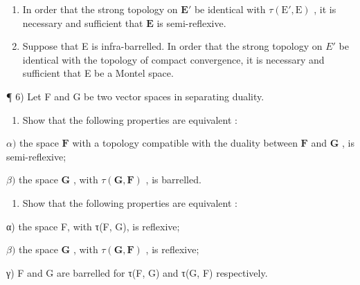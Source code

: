 \begin{enumerate}
\def\labelenumi{\alph{enumi})}
\item
  In order that the strong topology on \(\mathbf{E}'\) be identical with \(\tau (\mathrm{E}',\mathrm{E})\) , it is necessary and sufficient that \(\mathbf{E}\) is semi-reflexive.
\item
  Suppose that E is infra-barrelled. In order that the strong topology on \(E'\) be identical with the topology of compact convergence, it is necessary and sufficient that E be a Montel space.
\end{enumerate}

¶ 6) Let F and G be two vector spaces in separating duality.

\begin{enumerate}
\def\labelenumi{\alph{enumi})}
\tightlist
\item
  Show that the following properties are equivalent :
\end{enumerate}

\(\alpha)\) the space \(\mathbf{F}\) with a topology compatible with the duality between \(\mathbf{F}\) and \(\mathbf{G}\) , is semi-reflexive;

\(\beta)\) the space \(\mathbf{G}\) , with \(\tau (\mathbf{G},\mathbf{F})\) , is barrelled.

\begin{enumerate}
\def\labelenumi{\alph{enumi})}
\setcounter{enumi}{1}
\tightlist
\item
  Show that the following properties are equivalent :
\end{enumerate}

α) the space F, with τ(F, G), is reflexive;

\(\beta)\) the space \(\mathbf{G}\) , with \(\tau (\mathbf{G},\mathbf{F})\) , is reflexive;

γ) F and G are barrelled for τ(F, G) and τ(G, F) respectively.

